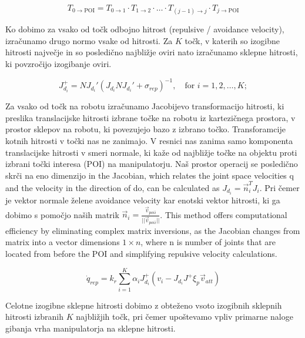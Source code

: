 \documentclass[letterpaper, 10 pt, conference]{ieeeconf}  %
\begin{document}
\begin{equation}
	T_{0 \rightarrow \text{POI}} = T_{0 \rightarrow 1} \cdot T_{1 \rightarrow 2} \cdot \ldots \cdot T_{(j-1) \rightarrow j} \cdot T_{j \rightarrow \text{POI}}	
\end{equation}

Ko dobimo za vsako od točk odbojno hitrost (repulsive / avoidance velocity), izračunamo drugo normo vsake od hitrosti. Za $K$ točk, v katerih so izogibne hitrosti največje in so posledično najbližje oviri nato izračunamo sklepne hitrosti, ki povzročijo izogibanje oviri. 


\begin{equation}
	J_{d_i}^{+} = N J_{d_i}' (J_{d_i} N J_{d_i}' + \sigma_{rep})^{-1}, \quad \text{for } i = 1, 2, \ldots, K;
\end{equation}

Za vsako od točk na robotu izračunamo Jacobijevo transformacijo hitrosti, ki preslika translacijske hitrosti izbrane točke na robotu iz kartezičnega prostora, v prostor sklepov na robotu, ki povezujejo bazo z izbrano točko. Transforamcije kotnih hitrosti v točki nas ne zanimajo. V resnici nas zanima samo komponenta translacijske hitrosti v smeri normale, ki kaže od najbližje točke na objektu proti izbrani točki interesa (POI) na manipulatorju. Naš prostor operacij se posledično skrči na eno dimenzijo in the Jacobian, which relates the joint space velocities q and the velocity in the direction of do, can be calculated as  $J_{d_i} = \vec{n}_i^T J_i$.   Pri čemer je vektor normale želene avoidance velocity kar enotski vektor hitrosti, ki ga dobimo s pomočjo naših matrik $\vec{n}_{i} = \frac{\vec{v}_{poi i}}{||\vec{v}_{poi i}||}$. This method offers computational efficiency by eliminating complex matrix inversions, as the Jacobian changes from matrix into a vector dimensions $1 \times n$, where n is number of joints that are located from before the POI and simplifying repulsive velocity calculations.

\begin{equation}
	\dot{q}_{rep} = k_r \sum_{i=1}^{K} \alpha_i J_{d_i}^{+} \left(v_i - J_{d_i} J^{+} \xi_{p} \vec{v}_{att}\right)
\end{equation}

Celotne izogibne sklepne hitrosti dobimo z obteženo vsoto izogibnih sklepnih hitrosti izbranih $K$ najbližjih točk, pri čemer upoštevamo vpliv primarne naloge gibanja vrha manipulatorja na sklepne hitrosti.
\end{document}
